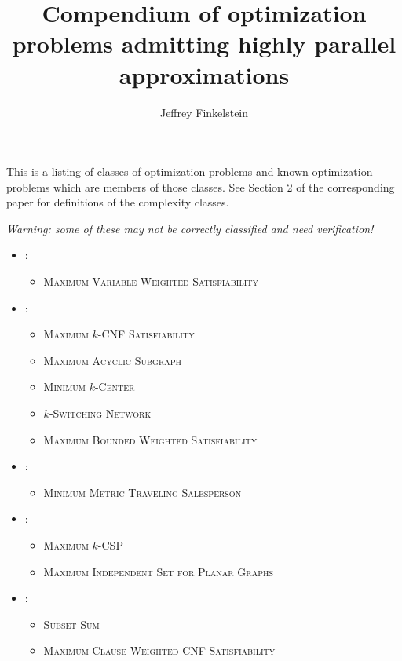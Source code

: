 \documentclass{article}
\title{Compendium of optimization problems admitting highly parallel approximations}
\author{Jeffrey Finkelstein}
\begin{document}
\maketitle

This is a listing of classes of optimization problems and known optimization problems which are members of those classes.
See Section 2 of the corresponding paper for definitions of the complexity classes.

\emph{Warning: some of these may not be correctly classified and need verification!}

\begin{itemize}
\item \NNCO:
  \begin{itemize}
  \item \textsc{Maximum Variable Weighted Satisfiability} \cite[Theorem~3.1]{om87} \cite[Theorem~8.3]{acgkmp99}
  \end{itemize}
\item \ApxNCO:
  \begin{itemize}
  \item \textsc{Maximum $k$-CNF Satisfiability} \cite[Theorem~8.6]{acgkmp99}
  \item \textsc{Maximum Acyclic Subgraph} \cite[Section~7.4]{dsst97}
  \item \textsc{Minimum $k$-Center} \cite[Section~7.4]{dsst97}
  \item \textsc{$k$-Switching Network} \cite[Section~7.4]{dsst97}
  \item \textsc{Maximum Bounded Weighted Satisfiability} \cite[Theorem~4]{sx95}
  \end{itemize}
\item \RNCAS:
  \begin{itemize}
  \item \textsc{Minimum Metric Traveling Salesperson} \cite[Theorem~7.1.1]{dsst97}
  \end{itemize}
\item \NCAS:
  \begin{itemize}
  \item \textsc{Maximum $k$-CSP} \cite[Corollary~13]{trevisan98}
  \item \textsc{Maximum Independent Set for Planar Graphs} \cite[Theorem 6.4.1]{dsst97}
  \end{itemize}
\item \FNCAS:
  \begin{itemize}
  \item \textsc{Subset Sum} \cite[Theorem~4.1.4]{dsst97}
  \item \textsc{Maximum Clause Weighted CNF Satisfiability} \cite[Theorem~8]{trevisan98}

\end{itemize}
\end{itemize}
\end{document}
